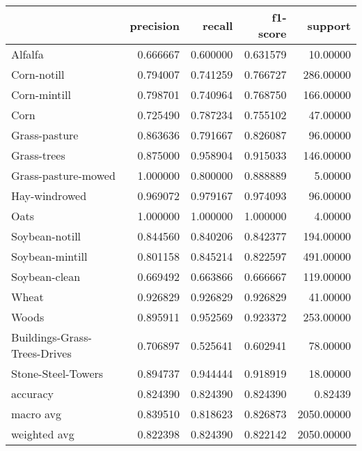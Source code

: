 \begin{tabular}{lrrrr}
\toprule
{} &  precision &    recall &  f1-score &     support \\
\midrule
Alfalfa                      &   0.666667 &  0.600000 &  0.631579 &    10.00000 \\
Corn-notill                  &   0.794007 &  0.741259 &  0.766727 &   286.00000 \\
Corn-mintill                 &   0.798701 &  0.740964 &  0.768750 &   166.00000 \\
Corn                         &   0.725490 &  0.787234 &  0.755102 &    47.00000 \\
Grass-pasture                &   0.863636 &  0.791667 &  0.826087 &    96.00000 \\
Grass-trees                  &   0.875000 &  0.958904 &  0.915033 &   146.00000 \\
Grass-pasture-mowed          &   1.000000 &  0.800000 &  0.888889 &     5.00000 \\
Hay-windrowed                &   0.969072 &  0.979167 &  0.974093 &    96.00000 \\
Oats                         &   1.000000 &  1.000000 &  1.000000 &     4.00000 \\
Soybean-notill               &   0.844560 &  0.840206 &  0.842377 &   194.00000 \\
Soybean-mintill              &   0.801158 &  0.845214 &  0.822597 &   491.00000 \\
Soybean-clean                &   0.669492 &  0.663866 &  0.666667 &   119.00000 \\
Wheat                        &   0.926829 &  0.926829 &  0.926829 &    41.00000 \\
Woods                        &   0.895911 &  0.952569 &  0.923372 &   253.00000 \\
Buildings-Grass-Trees-Drives &   0.706897 &  0.525641 &  0.602941 &    78.00000 \\
Stone-Steel-Towers           &   0.894737 &  0.944444 &  0.918919 &    18.00000 \\
accuracy                     &   0.824390 &  0.824390 &  0.824390 &     0.82439 \\
macro avg                    &   0.839510 &  0.818623 &  0.826873 &  2050.00000 \\
weighted avg                 &   0.822398 &  0.824390 &  0.822142 &  2050.00000 \\
\bottomrule
\end{tabular}
